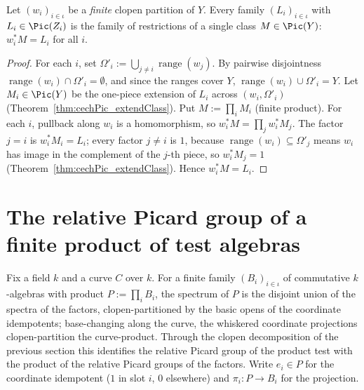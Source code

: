 \begin{theorem}
  \label{thm:cechPic_clopen_gluing}
  \leanok
  Let \((w_i)_{i \in \iota}\) be a \emph{finite} clopen partition of \(Y\). Every family
  \((L_i)_{i \in \iota}\) with \(L_i \in \Pic(Z_i)\) is the family of restrictions of a single
  class \(M \in \Pic(Y)\): \(w_i^{*} M = L_i\) for all \(i\).
\end{theorem}
\begin{proof}
  \leanok
  For each \(i\), set \(\Omega'_i := \bigcup_{j \ne i} \operatorname{range}(w_j)\). By pairwise
  disjointness \(\operatorname{range}(w_i) \cap \Omega'_i = \emptyset\), and since the ranges cover
  \(Y\), \(\operatorname{range}(w_i) \cup \Omega'_i = Y\). Let \(M_i \in \Pic(Y)\) be the one-piece
  extension of \(L_i\) across \((w_i, \Omega'_i)\) (Theorem~\ref{thm:cechPic_extendClass}). Put
  \(M := \prod_{i} M_i\) (finite product). For each \(i\), pullback along \(w_i\) is a homomorphism,
  so \(w_i^{*} M = \prod_j w_i^{*} M_j\). The factor \(j = i\) is \(w_i^{*} M_i = L_i\); every factor
  \(j \ne i\) is \(1\), because \(\operatorname{range}(w_i) \subseteq \Omega'_j\) means \(w_i\) has
  image in the complement of the \(j\)-th piece, so \(w_i^{*}M_j = 1\)
  (Theorem~\ref{thm:cechPic_extendClass}). Hence \(w_i^{*} M = L_i\).
\end{proof}

\section{The relative Picard group of a finite product of test algebras}

Fix a field \(k\) and a curve \(C\) over \(k\). For a finite family \((B_i)_{i \in \iota}\) of
commutative \(k\)-algebras with product \(P := \prod_i B_i\), the spectrum of \(P\) is the disjoint
union of the spectra of the factors, clopen-partitioned by the basic opens of the coordinate
idempotents; base-changing along the curve, the whiskered coordinate projections clopen-partition
the curve-product. Through the clopen decomposition of the previous section this identifies the
relative Picard group of the product test with the product of the relative Picard groups of the
factors. Write \(e_i \in P\) for the coordinate idempotent (\(1\) in slot \(i\), \(0\) elsewhere)
and \(\pi_i \colon P \to B_i\) for the projection.

